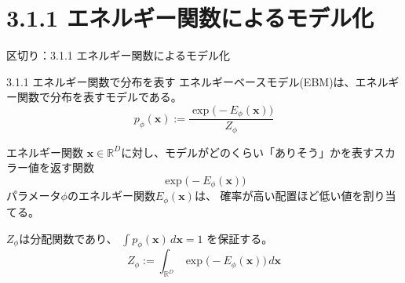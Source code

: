 \section{3.1.1 エネルギー関数によるモデル化}
\asmain
\begin{frame}{区切り：3.1.1 エネルギー関数によるモデル化}
    \tableofcontents[currentsection]
\end{frame}
\asmain
\begin{frame}{3.1.1 エネルギー関数で分布を表す}
    エネルギーベースモデル(EBM)は、エネルギー関数で分布を表すモデルである。
    \[
    p_\phi(\bm{x}):=
    \frac{\exp\!\bigl(-E_\phi(\bm{x})\bigr)}{Z_\phi}
\]
    \begin{block}{エネルギー関数}
        $\bm{x}\in\mathbb{R}^{D}$に対し、モデルがどのくらい「ありそう」かを表すスカラー値を返す関数\\
        \[
\exp\!\bigl(-E_\phi(\bm{x})\bigr)
\]
        パラメータ$\phi$のエネルギー関数$E_\phi(\bm{x})$は、
    確率が高い配置ほど低い値を割り当てる。
    \end{block}
    $Z_\phi$は分配関数であり、
    $\displaystyle\int p_\phi(\bm{x})\,d\bm{x}=1$
    を保証する。
    \[
        Z_\phi
        :=
        \int_{\mathbb{R}^{D}}
        \exp\!\bigl(-E_\phi(\bm{x})\bigr)
        \,d\bm{x}
\]


\end{frame}
\assuppl
